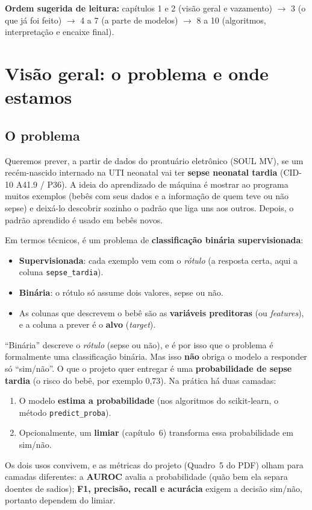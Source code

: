 \documentclass[11pt,a4paper]{article}
\newcommand{\cod}[1]{\texttt{#1}}
\begin{document}
\textbf{Ordem sugerida de leitura:} capítulos 1 e 2 (visão geral e vazamento) $\rightarrow$ 3 (o que já foi feito) $\rightarrow$ 4 a 7 (a parte de modelos) $\rightarrow$ 8 a 10 (algoritmos, interpretação e encaixe final).

\section{Visão geral: o problema e onde estamos}

\subsection{O problema}

Queremos prever, a partir de dados do prontuário eletrônico (SOUL MV), se um recém-nascido internado na UTI neonatal
vai ter \textbf{sepse neonatal tardia} (CID-10 A41.9 / P36). A ideia do aprendizado de máquina é mostrar ao programa
muitos exemplos (bebês com seus dados e a informação de quem teve ou não sepse) e deixá-lo descobrir sozinho o padrão
que liga uns aos outros. Depois, o padrão aprendido é usado em bebês novos.

Em termos técnicos, é um problema de \textbf{classificação binária supervisionada}:
\begin{itemize}
  \item \textbf{Supervisionada}: cada exemplo vem com o \emph{rótulo} (a resposta certa, aqui a coluna \cod{sepse\_tardia}).
  \item \textbf{Binária}: o rótulo só assume dois valores, sepse ou não.
  \item As colunas que descrevem o bebê são as \textbf{variáveis preditoras} (ou \emph{features}), e a coluna a prever é o \textbf{alvo} (\emph{target}).
\end{itemize}

\begin{conceito}
``Binária'' descreve o \emph{rótulo} (sepse ou não), e é por isso que o problema é formalmente uma classificação binária. Mas isso
\textbf{não} obriga o modelo a responder só ``sim/não''. O que o projeto quer entregar é uma \textbf{probabilidade de sepse tardia}
(o risco do bebê, por exemplo 0,73). Na prática há duas camadas:
\begin{enumerate}
  \item O modelo \textbf{estima a probabilidade} (nos algoritmos do scikit-learn, o método \cod{predict\_proba}).
  \item Opcionalmente, um \textbf{limiar} (capítulo~6) transforma essa probabilidade em sim/não.
\end{enumerate}
Os dois usos convivem, e as métricas do projeto (Quadro~5 do PDF) olham para camadas diferentes: a \textbf{AUROC} avalia a probabilidade
(quão bem ela separa doentes de sadios); \textbf{F1, precisão, recall e acurácia} exigem a decisão sim/não, portanto dependem do limiar.
\end{conceito}
\end{document}
